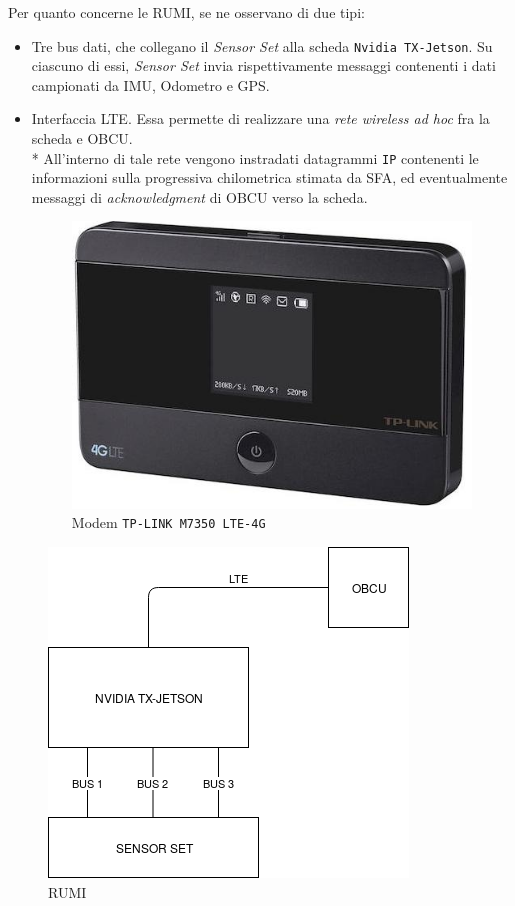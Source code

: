 	Per quanto concerne le RUMI, se ne osservano di due tipi:
	\begin{itemize}
		\item Tre bus dati, che collegano il \emph{Sensor Set} alla scheda \texttt{Nvidia TX-Jetson}. Su ciascuno di essi, \emph{Sensor Set} invia rispettivamente messaggi contenenti i dati campionati da IMU, Odometro e GPS.
		\item Interfaccia LTE. Essa permette di realizzare una \emph{rete wireless ad hoc} fra la scheda e OBCU.\\*
		All'interno di tale rete vengono instradati datagrammi \texttt{IP} contenenti le informazioni sulla progressiva chilometrica stimata da SFA, ed eventualmente messaggi di \emph{acknowledgment} di OBCU verso la scheda.
		\begin{figure}[h]
			\centering
			\includegraphics[scale=0.40]{img/lte}
			\caption{Modem \texttt{TP-LINK M7350 LTE-4G}}
			\label{fig:lte}
		\end{figure}
	\end{itemize}
	\begin{figure}[h]
		\centering
		\includegraphics[width=0.7\linewidth]{img/TrainDiagram}
		\caption{RUMI}
		\label{fig:tdiagram}
	\end{figure}
	
